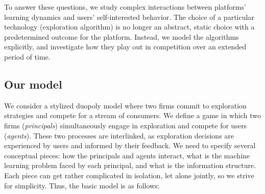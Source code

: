 To answer these questions, we study complex interactions between platforms' learning dynamics and users' self-interested behavior. The choice of a particular technology (exploration algorithm) is no longer an abstract, static choice with a predetermined outcome for the platform. Instead, we model the algorithms explicitly, and investigate how they play out in competition over an extended period of time.






\subsection{Our model}
\label{sec:intro-model}
 
 We consider a stylized duopoly model where two firms commit to exploration strategies and compete for a stream of consumers. We define a game in which two firms (\emph{principals}) simultaneously engage in exploration and compete for users (\emph{agents}). These two processes are interlinked, as exploration decisions are experienced by users and informed by their feedback. We need to specify several conceptual pieces: how the principals and agents interact, what is the machine learning problem faced by each principal, and what is the information structure. Each piece can get rather complicated in isolation, let alone jointly, so we strive for simplicity. Thus, the basic model is as follows:

